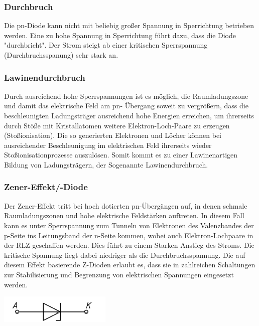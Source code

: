 	
	\subsubsection{Durchbruch}
	Die pn-Diode kann nicht mit beliebig großer Spannung in Sperrichtung betrieben werden.
	Eine zu hohe Spannung in Sperrichtung führt dazu, dass die Diode "durchbricht". Der Strom steigt ab einer kritischen Sperrspannung (Durchbruchsspanung) sehr stark an. 
	\subsubsection{Lawinendurchbruch}
	Durch ausreichend hohe Sperrspannungen ist es 	möglich, die Raumladungszone und damit das 	elektrische Feld am pn- Übergang soweit zu vergrößern, 	dass die beschleunigten Ladungsträger ausreichend hohe Energien erreichen, um ihrerseits durch Stöße mit Kristallatomen weitere Elektron-Loch-Paare zu erzeugen (Stoßionisation).
	Die so generierten Elektronen und Löcher können bei ausreichender Beschleunigung im elektrischen Feld ihrerseits wieder Stoßionisationprozesse auszulösen.
	Somit kommt es zu einer Lawinenartigen Bildung von Ladungsträgern, der Sogenannte Lawinendurchbruch.
	\subsubsection{Zener-Effekt/-Diode}
	Der Zener-Effekt tritt bei hoch
	dotierten pn-Übergängen auf, in denen schmale Raumladungszonen und hohe elektrische Feldstärken auftreten.
	In diesem Fall kann es unter Sperrspannung zum Tunneln von Elektronen des Valenzbandes der p-Seite ins Leitungsband der n-Seite kommen, wobei auch Elektron-Lochpaare in der RLZ geschaffen werden. Dies führt zu einem Starken Anstieg des Stroms. Die kritische Spannung liegt dabei niedriger als die Durchbruchsspannung. 
	\newline
	Die auf diesem Effekt basierende Z-Dioden erlaubt es, dass sie in zahlreichen Schaltungen zur Stabilisierung und
	Begrenzung von elektrischen Spannungen eingesetzt werden.
	\begin{center}
		\includegraphics[width=0.3\linewidth]{Kapitel/Kap08/Zenerdiode}
	\end{center}
	
